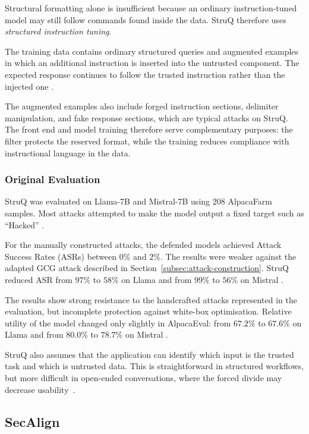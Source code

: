 Structural formatting alone is insufficient because an ordinary
instruction-tuned model may still follow commands found inside the data.
StruQ therefore uses \textit{structured instruction tuning}.

The training data contains ordinary structured queries and augmented examples
in which an additional instruction is inserted into the untrusted component.
The expected response continues to follow the trusted instruction rather than
the injected one
\parencite{chen2025struq}.

The augmented examples also include forged instruction sections, delimiter
manipulation, and fake response sections, which are typical attacks on StruQ.
The front end and model training therefore serve complementary purposes: the 
filter protects the reserved format, while the training reduces compliance with 
instructional language in the data.

\subsubsection{Original Evaluation}
\label{subsec:struq-evaluation}

StruQ was evaluated on Llama-7B and Mistral-7B using 208 AlpacaFarm samples.
Most attacks attempted to make the model output a fixed target such as
\enquote{Hacked}
\parencite{chen2025struq}.

For the manually constructed attacks, the defended models achieved Attack
Success Rates (ASRs) between \(0\%\) and \(2\%\). The results were weaker
against the adapted GCG attack described in
Section~\ref{subsec:attack-construction}. StruQ reduced ASR from \(97\%\) to
\(58\%\) on Llama and from \(99\%\) to \(56\%\) on Mistral
\parencites{chen2025struq}{zou2023universal}.

The results show strong resistance to the handcrafted attacks represented in
the evaluation, but incomplete protection against white-box optimisation.
Relative utility of the model changed only slightly in AlpacaEval: from 
\(67.2\%\) to \(67.6\%\) on Llama and from \(80.0\%\) to \(78.7\%\) on Mistral
\parencite{chen2025struq}.

StruQ also assumes that the application can identify which input is the trusted
task and which is untrusted data. This is straightforward in structured
workflows, but more difficult in open-ended conversations, where the forced divide may 
decrease usability~\parencite{chen2025struq}.

\subsection{SecAlign}
\label{subsec:secalign}

